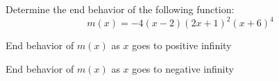 \documentclass{ximera}
\author{David Kish}
\begin{document}
\begin{exercise}
Determine the end behavior of the following function:
\[
m(x)=-4(x-2)(2x+1)^2(x+6)^4
\]
\begin{exercise}
End behavior of $m(x)$ as $x$ goes to positive infinity
\begin{multipleChoice}
\end{multipleChoice}
\end{exercise}
\begin{exercise}
End behavior of $m(x)$ as $x$ goes to negative infinity
\begin{multipleChoice}
\end{multipleChoice}
\end{exercise}

\end{exercise}
\end{document}
